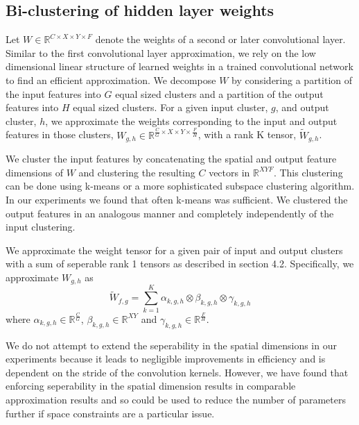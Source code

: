 \subsection{Bi-clustering of hidden layer weights}
Let $W \in \mathbb{R}^{C \times X \times Y \times F}$ denote the weights of a second or later convolutional layer. Similar to the first convolutional layer approximation, we rely on the low dimensional linear structure of learned weights in a trained convolutional network to find an efficient approximation. We decompose $W$ by considering a partition of the input features into $G$ equal sized clusters and a partition of the output features into $H$ equal sized clusters. For a given input cluster, $g$, and output cluster, $h$, we approximate the weights corresponding to the input and output features in those clusters, $W_{g,h} \in \mathbb{R}^{\frac{C}{G} \times X \times Y \times \frac{F}{H}}$, with a rank K tensor, $\tilde{W}_{g,h}$.  

We cluster the input features by concatenating the spatial and output feature dimensions of $W$ and clustering the resulting $C$ vectors in $\mathbb{R}^{XYF}$. This clustering can be done using k-means or a more sophisticated subspace clustering algorithm. In our experiments we found that often k-means was sufficient. We clustered the output features in an analogous manner and completely independently of the input clustering. 

We approximate the weight tensor for a given pair of input and output clusters with a sum of seperable rank 1 tensors as described in section 4.2. Specifically, we approximate $W_{g,h}$ as
\begin{equation*}
	\tilde{W}_{f,g} = \sum_{k=1}^{K} \alpha_{k,g,h} \otimes \beta_{k,g,h} \otimes \gamma_{k,g,h}
\end{equation*}
where $\alpha_{k,g,h} \in \mathbb{R}^{\frac{C}{G}}$, $\beta_{k,g,h} \in \mathbb{R}^{XY}$ and $\gamma_{k,g,h} \in \mathbb{R}^{\frac{F}{H}}$.

We do not attempt to extend the seperability in the spatial dimensions in our experiments because it leads to negligible improvements in efficiency and is dependent on the stride of the convolution kernels. However, we have found that enforcing seperability in the spatial dimension results in comparable approximation results and so could be used to reduce the number of parameters further if space constraints are a particular issue. 

